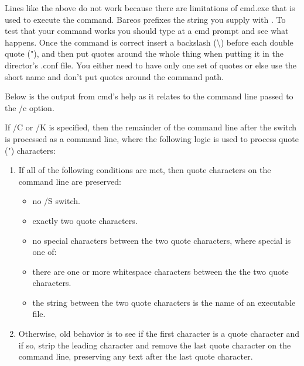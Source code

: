 {

Lines like the above do not work because there are limitations of
cmd.exe that is used to execute the command.
Bareos prefixes the string you supply with .  To test that
your command works you should type  at a
cmd prompt and see what happens.  Once the command is correct insert a
backslash (\textbackslash{}) before each double quote ("), and
then put quotes around the whole thing when putting it in
the director's .conf file.  You either need to have only one set of quotes
or else use the short name and don't put quotes around the command path.

Below is the output from cmd's help as it relates to the command line
passed to the /c option.

If /C or /K is specified, then the remainder of the command line after
the switch is processed as a command line, where the following logic is
used to process quote (") characters:

\begin{enumerate}
\item
If all of the following conditions are met, then quote characters
on the command line are preserved:
\begin{itemize}
\item no /S switch.
\item exactly two quote characters.
\item no special characters between the two quote characters,
where special is one of: \configCharsToQuote
\item there are one or more whitespace characters between the
the two quote characters.
\item the string between the two quote characters is the name
of an executable file.
\end{itemize}

\item  Otherwise, old behavior is to see if the first character is
a quote character and if so, strip the leading character and
remove the last quote character on the command line, preserving
any text after the last quote character.
\end{enumerate}

}
